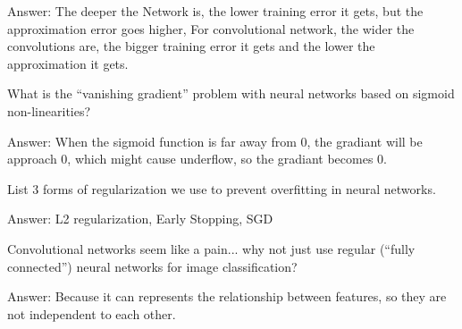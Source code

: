 \documentclass{article}
\def\ans#1{\par\gre{Answer: #1}}
\def\gre#1{{\color{gre}#1}}
\begin{document}
{{\ans{The deeper the Network is, the lower training error it gets, but the approximation error goes higher, For convolutional network, the wider the convolutions are, the bigger training error it gets and the lower the approximation it gets.}
\item What is the ``vanishing gradient'' problem with neural networks based on sigmoid non-linearities?
\ans{When the sigmoid function is far away from 0, the gradiant will be approach 0, which might cause underflow, so the gradiant becomes 0.}
\item List 3 forms of regularization we use to prevent overfitting in neural networks.
\ans{L2 regularization, Early Stopping, SGD}
\item Convolutional networks seem like a pain... why not just use regular (``fully connected'') neural networks for image classification?
\ans{Because it can represents the relationship between features, so they are not independent to each other.}
}
}
\end{document}
